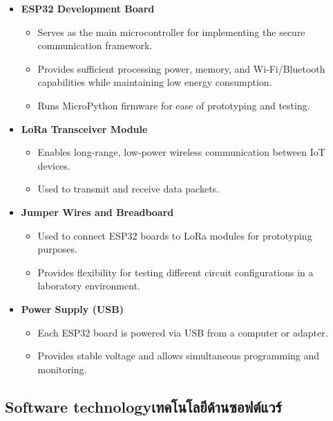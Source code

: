 \begin{itemize}
    \item \textbf{ESP32 Development Board} 
    \begin{itemize}
            \item Serves as the main microcontroller for implementing the secure communication framework. \item Provides sufficient processing power, memory, and Wi-Fi/Bluetooth capabilities while maintaining low energy consumption.
            \item Runs MicroPython firmware for ease of prototyping and testing.

        \end{itemize} 
    \item \textbf{LoRa Transceiver Module} 
        \begin{itemize} 
            \item Enables long-range, low-power wireless communication between IoT devices.
            \item Used to transmit and receive data packets.
        \end{itemize} 

    \item \textbf{Jumper Wires and Breadboard} 
        \begin{itemize} 
            \item  Used to connect ESP32 boards to LoRa modules for prototyping purposes.
            \item    Provides flexibility for testing different circuit configurations in a laboratory environment.
        \end{itemize} 
 

    \item \textbf{Power Supply (USB)} 
      \begin{itemize} 
            \item Each ESP32 board is powered via USB from a computer or adapter.
            \item Provides stable voltage and allows simultaneous programming and monitoring.
        \end{itemize} 
\end{itemize}


\subsection{\ifenglish Software technology\else เทคโนโลยีด้านซอฟต์แวร์\fi}

